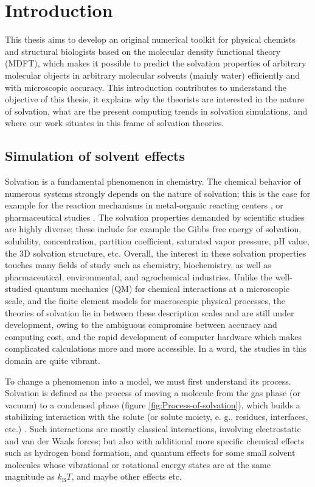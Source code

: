 
\chapter{Introduction\label{chpt:introduction}}

This thesis aims to develop an original numerical toolkit for physical
chemists and structural biologists based on the molecular density
functional theory (\acs{MDFT}), which makes it possible to predict
the solvation properties of arbitrary molecular objects in arbitrary
molecular solvents (mainly water) efficiently and with microscopic
accuracy. This introduction contributes to understand the objective
of this thesis, it explains why the theorists are interested in the
nature of solvation, what are the present computing trends in solvation
simulations, and where our work situates in this frame of solvation
theories.

\section{Simulation of solvent effects}

Solvation is a fundamental phenomenon in chemistry. The chemical behavior
of numerous systems strongly depends on the nature of solvation; this
is the case for example for the reaction mechanisms in metal-organic
reacting centers \citep{Mn-oxo,PCET}, or pharmaceutical studies \citep{drug_1_Perlovich,drug_2_Perlovich,drug_3}.
The solvation properties demanded by scientific studies are highly
diverse; these include for example the Gibbs free energy of solvation,
solubility, concentration, partition coefficient, saturated vapor
pressure, pH value, the 3D solvation structure, etc. Overall, the
interest in these solvation properties touches many fields of study
such as chemistry, biochemistry, as well as pharmaceutical, environmental,
and agrochemical industries. Unlike the well-studied quantum mechanics
(\acs{QM}) for chemical interactions at a microscopic scale, and
the finite element models for macroscopic physical processes, the
theories of solvation lie in between these description scales and
are still under development, owing to the ambiguous compromise between
accuracy and computing cost, and the rapid development of computer
hardware which makes complicated calculations more and more accessible.
In a word, the studies in this domain are quite vibrant.

To change a phenomenon into a model, we must first understand its
process. Solvation is defined as the process of moving a molecule
from the gas phase (or vacuum) to a condensed phase (figure \ref{fig:Process-of-solvation}),
which builds a stabilizing interaction with the solute (or solute
moiety, e. g., residues, interfaces, etc.) \citep{iupac}. Such interactions
are mostly classical interactions, involving electrostatic and van
der Waals forces; but also with additional more specific chemical
effects such as hydrogen bond formation, and quantum effects for some
small solvent molecules whose vibrational or rotational energy states
are at the same magnitude as $k_{\mathrm{B}}T$, and maybe other effects
etc.

